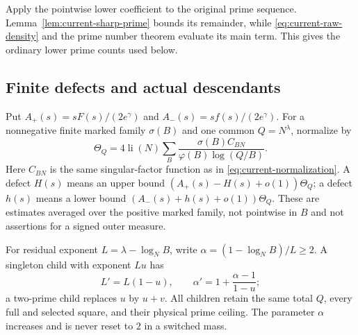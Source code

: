 Apply the pointwise lower coefficient to the original prime sequence.
Lemma~\ref{lem:current-sharp-prime} bounds its remainder, while
\eqref{eq:current-raw-density} and the prime number theorem evaluate
its main term. This gives the ordinary lower prime counts used below.

\subsection{Finite defects and actual descendants}

Put
$A_+(s)=sF(s)/(2e^\gamma)$ and
$A_-(s)=sf(s)/(2e^\gamma)$.
For a nonnegative finite marked family $\sigma(B)$ and one common
$Q=N^\lambda$, normalize by
\[
 \Theta_Q=4\operatorname{li}(N)
       \sum_B\frac{\sigma(B)C_{BN}}{\varphi(B)\log(Q/B)}.
\]
Here $C_{BN}$ is the same singular-factor function as in
\eqref{eq:current-normalization}.  A defect $H(s)$ means an upper
bound $(A_+(s)-H(s)+o(1))\Theta_Q$; a defect $h(s)$ means a lower
bound $(A_-(s)+h(s)+o(1))\Theta_Q$.  These are estimates
averaged over the positive marked family, not pointwise in $B$ and
not assertions for a signed outer measure.

For residual exponent $L=\lambda-\log_NB$, write
$\alpha=(1-\log_NB)/L\ge2$.  A singleton child with exponent $Lu$
has
\[
 L'=L(1-u),\qquad \alpha'=1+\frac{\alpha-1}{1-u};
\]
a two-prime child replaces $u$ by $u+v$.  All children retain the
same total $Q$, every full and selected square, and their physical
prime ceiling.  The parameter $\alpha$ increases and is never
reset to $2$ in a switched mass.


